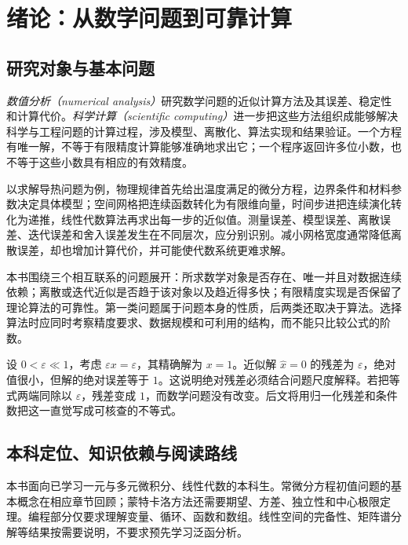 \setcounter{chapter}{0} %
\chapter{绪论：从数学问题到可靠计算}
\label{chap:na-intro}

\section{研究对象与基本问题}
\emph{数值分析（numerical analysis）}研究数学问题的近似计算方法及其误差、稳定性和计算代价。\emph{科学计算（scientific computing）}进一步把这些方法组织成能够解决科学与工程问题的计算过程，涉及模型、离散化、算法实现和结果验证。一个方程有唯一解，不等于有限精度计算能够准确地求出它；一个程序返回许多位小数，也不等于这些小数具有相应的有效精度。

以求解导热问题为例，物理规律首先给出温度满足的微分方程，边界条件和材料参数决定具体模型；空间网格把连续函数转化为有限维向量，时间步进把连续演化转化为递推，线性代数算法再求出每一步的近似值。测量误差、模型误差、离散误差、迭代误差和舍入误差发生在不同层次，应分别识别。减小网格宽度通常降低离散误差，却也增加计算代价，并可能使代数系统更难求解。

本书围绕三个相互联系的问题展开：所求数学对象是否存在、唯一并且对数据连续依赖；离散或迭代近似是否趋于该对象以及趋近得多快；有限精度实现是否保留了理论算法的可靠性。第一类问题属于问题本身的性质，后两类还取决于算法。选择算法时应同时考察精度要求、数据规模和可利用的结构，而不能只比较公式的阶数。

\begin{example}[很小的残差能说明什么]
\label{ex:na-intro-residual}
设 $0<\varepsilon\ll1$，考虑 $\varepsilon x=\varepsilon$，其精确解为 $x=1$。近似解 $\widehat x=0$ 的残差为 $\varepsilon$，绝对值很小，但解的绝对误差等于 $1$。这说明绝对残差必须结合问题尺度解释。若把等式两端同除以 $\varepsilon$，残差变成 $1$，而数学问题没有改变。后文将用归一化残差和条件数把这一直觉写成可核查的不等式。
\end{example}

\section{本科定位、知识依赖与阅读路线}
本书面向已学习一元与多元微积分、线性代数的本科生。常微分方程初值问题的基本概念在相应章节回顾；蒙特卡洛方法还需要期望、方差、独立性和中心极限定理。编程部分仅要求理解变量、循环、函数和数组。线性空间的完备性、矩阵谱分解等结果按需要说明，不要求预先学习泛函分析。

